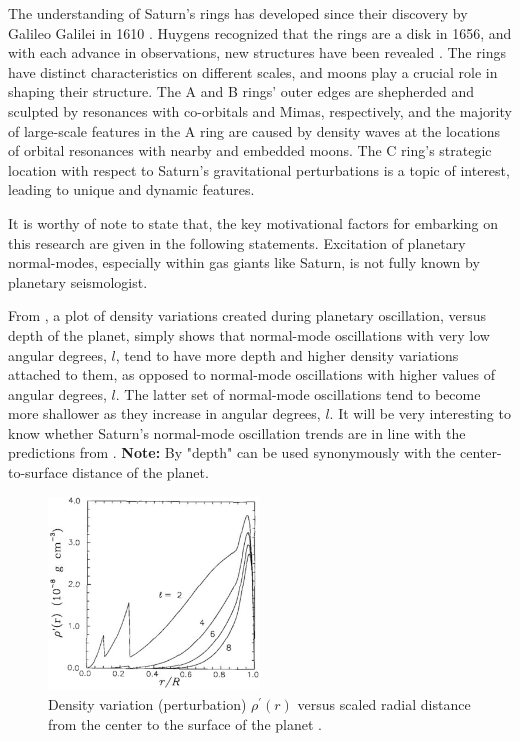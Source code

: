 \documentclass{article}
\begin{document}
The understanding of Saturn's rings has developed since their discovery by Galileo Galilei in 1610 \cite{2009sfch.book..375C}. Huygens recognized that the rings are a disk in 1656, and with each advance in observations, new structures have been revealed \cite{2009sfch.book..375C}\cite{FRENCH2019599}\cite{2014MNRAS.444.1369H}. The rings have distinct characteristics on different scales, and moons play a crucial role in shaping their structure. The A and B rings' outer edges are shepherded and sculpted by resonances with co-orbitals and Mimas, respectively, and the majority of large-scale features in the A ring are caused by density waves at the locations of orbital resonances with nearby and embedded moons. The C ring's strategic location with respect to Saturn's gravitational perturbations is a topic of interest, leading to unique and dynamic features.

It is worthy of note to state that, the key motivational factors for embarking on this research are given in the following statements. Excitation of planetary normal-modes, especially within gas giants like Saturn, is not fully known by planetary seismologist. 

From \cite{Marley1993PlanetaryAM}, a plot of density variations created during planetary oscillation, versus depth of the planet, simply shows that normal-mode oscillations with very low angular degrees, $l$, tend to have more depth and higher density variations attached to them, as opposed to normal-mode oscillations with higher values of angular degrees, $l$. The latter set of normal-mode oscillations tend to become more shallower as they increase in angular degrees, $l$. It will be very interesting to know whether Saturn's normal-mode oscillation trends are in line with the predictions from \cite{Marley1993PlanetaryAM}. 
\textbf{Note:} By "depth" can be used synonymously with the center-to-surface distance of the planet.
\begin{figure}[h] 
\centering
\includegraphics[width=0.5\textwidth]{marley_and_porco.png}
\caption{Density variation (perturbation) $\rho^{'}(r)$ versus scaled radial distance from the center to the surface of the planet \cite{Marley1993PlanetaryAM}.} \label{fig:my_label}
\end{figure}
\end{document}
